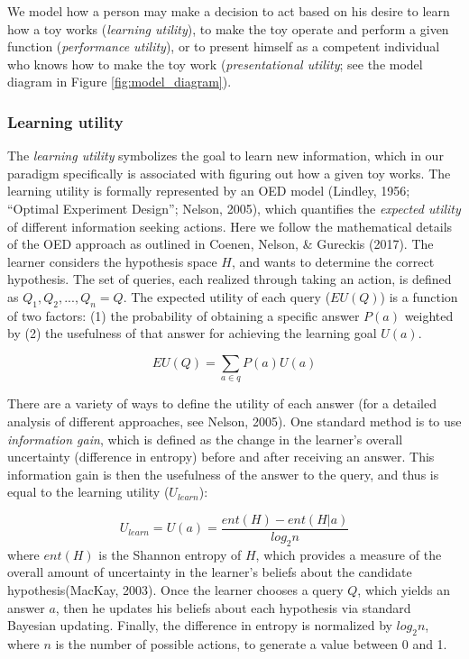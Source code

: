 \documentclass[10pt, letterpaper]{article}
\begin{document}
We model how a person may make a decision to act based on his desire to
learn how a toy works (\emph{learning utility}), to make the toy operate
and perform a given function (\emph{performance utility}), or to present
himself as a competent individual who knows how to make the toy work
(\emph{presentational utility}; see the model diagram in Figure
\ref{fig:model_diagram}).

\subsubsection{Learning utility}\label{learning-utility}

The \emph{learning utility} symbolizes the goal to learn new
information, which in our paradigm specifically is associated with
figuring out how a given toy works. The learning utility is formally
represented by an OED model (Lindley, 1956; ``Optimal Experiment
Design''; Nelson, 2005), which quantifies the \emph{expected utility} of
different information seeking actions. Here we follow the mathematical
details of the OED approach as outlined in Coenen, Nelson, \& Gureckis
(2017). The learner considers the hypothesis space \(H\), and wants to
determine the correct hypothesis. The set of queries, each realized
through taking an action, is defined as \(Q_1, Q_2, ..., Q_n = {Q}\).
The expected utility of each query (\(EU(Q)\)) is a function of two
factors: (1) the probability of obtaining a specific answer \(P(a)\)
weighted by (2) the usefulness of that answer for achieving the learning
goal \(U(a)\).

\[EU(Q) = \sum_{a\in q}{P(a)U(a)}\]

There are a variety of ways to define the utility of each answer (for a
detailed analysis of different approaches, see Nelson, 2005). One
standard method is to use \emph{information gain}, which is defined as
the change in the learner's overall uncertainty (difference in entropy)
before and after receiving an answer. This information gain is then the
usefulness of the answer to the query, and thus is equal to the learning
utility (\(U_{learn}\)):

\[ U_{learn} = U(a) = \frac{ent(H) - ent(H|a)}{log_2n}\] \noindent
where \(ent(H)\) is the Shannon entropy of \(H\), which provides a
measure of the overall amount of uncertainty in the learner's beliefs
about the candidate hypothesis(MacKay, 2003). Once the learner chooses a
query \(Q\), which yields an answer \(a\), then he updates his beliefs
about each hypothesis via standard Bayesian updating. Finally, the
difference in entropy is normalized by \(log_2 n\), where \(n\) is the
number of possible actions, to generate a value between 0 and 1.
\end{document}
